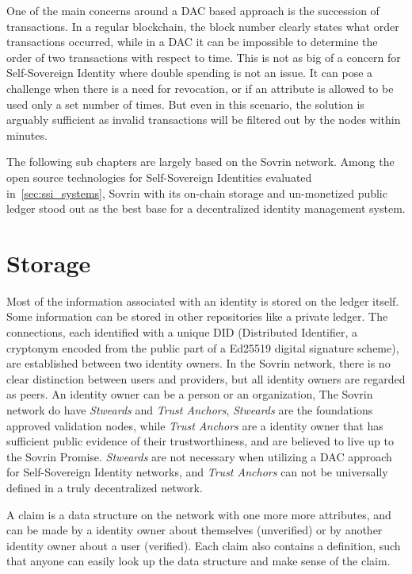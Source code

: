 One of the main concerns around a DAC based approach is the succession of transactions. In a regular blockchain, the block number clearly states what order transactions occurred, while in a DAC it can be impossible to determine the order of two transactions with respect to time. This is not as big of a concern for Self-Sovereign Identity where double spending is not an issue. It can pose a challenge when there is a need for revocation, or if an attribute is allowed to be used only a set number of times. But even in this scenario, the solution is arguably sufficient as invalid transactions will be filtered out by the nodes within minutes.

\newpage
The following sub chapters are largely based on the Sovrin network. Among the open source technologies for Self-Sovereign Identities evaluated in~\ref{sec:ssi_systems}, Sovrin with its on-chain storage and un-monetized public ledger stood out as the best base for a decentralized identity management system.

\section{Storage}
Most of the information associated with an identity is stored on the ledger itself. Some information can be stored in other repositories like a private ledger. The connections, each identified with a unique DID (Distributed Identifier, a cryptonym encoded from the public part of a Ed25519 digital signature scheme), are established between two identity owners. In the Sovrin network, there is no clear distinction between users and providers, but all identity owners are regarded as peers. An identity owner can be a person or an organization, The Sovrin network do have \textit{Stweards} and \textit{Trust Anchors}, \textit{Stweards} are the foundations approved validation nodes, while \textit{Trust Anchors} are a identity owner that has sufficient public evidence of their trustworthiness, and are believed to live up to the Sovrin Promise. \textit{Stweards} are not necessary when utilizing a DAC approach for Self-Sovereign Identity networks, and \textit{Trust Anchors} can not be universally defined in a truly decentralized network. 

A claim is a data structure on the network with one more more attributes, and can be made by a identity owner about themselves (unverified) or by another identity owner about a user (verified). Each claim also contains a definition, such that anyone can easily look up the data structure and make sense of the claim.
